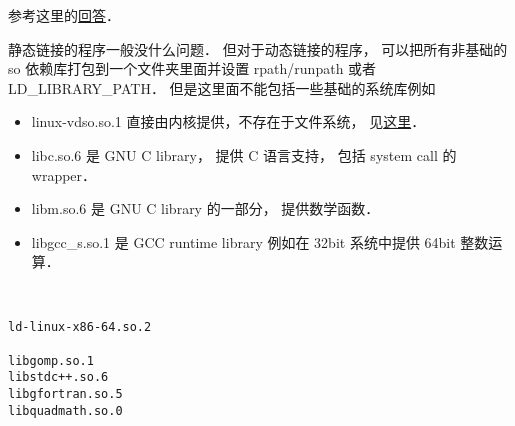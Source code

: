 
\begin{issues}
\issueDraft
\end{issues}


参考这里的\href{https://stackoverflow.com/questions/20183883/determining-binary-compatibility-under-linux}{回答}．

静态链接的程序一般没什么问题． 但对于动态链接的程序， 可以把所有非基础的 so 依赖库打包到一个文件夹里面并设置 rpath/runpath 或者 LD_LIBRARY_PATH． 但是这里面不能包括一些基础的系统库例如
\begin{itemize}
\item linux-vdso.so.1 直接由内核提供，不存在于文件系统， 见\href{https://unix.stackexchange.com/questions/476971/ldd-shows-no-location-after-arrow-library-does-not-exist-on-system}{这里}．
\item libc.so.6 是 GNU C library， 提供 C 语言支持， 包括 system call 的 wrapper．
\item libm.so.6 是 GNU C library 的一部分， 提供数学函数．
\item libgcc_s.so.1 是 GCC runtime library 例如在 32bit 系统中提供 64bit 整数运算．
\end{itemize}

\begin{lstlisting}[language=none]


ld-linux-x86-64.so.2

libgomp.so.1
libstdc++.so.6
libgfortran.so.5
libquadmath.so.0
\end{lstlisting}
